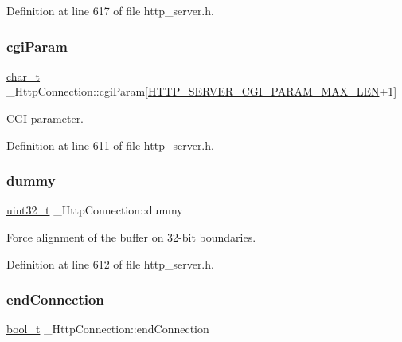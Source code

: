 Definition at line 617 of file http\+\_\+server.\+h.

\mbox{\label{struct__HttpConnection_a7ebae941dca2f49564380d3033849463}} 
\subsubsection{\texorpdfstring{cgi\+Param}{cgiParam}}
{\footnotesize\ttfamily \hyperlink{compiler__port_8h_a40bb5262bf908c328fbcfbe5d29d0201}{char\+\_\+t} \+\_\+\+Http\+Connection\+::cgi\+Param\mbox{[}\hyperlink{http__server_8h_a4a3fc828d1b1db329b49b1f339eb06fe}{H\+T\+T\+P\+\_\+\+S\+E\+R\+V\+E\+R\+\_\+\+C\+G\+I\+\_\+\+P\+A\+R\+A\+M\+\_\+\+M\+A\+X\+\_\+\+L\+EN}+1\mbox{]}}



C\+GI parameter. 



Definition at line 611 of file http\+\_\+server.\+h.

\mbox{\label{struct__HttpConnection_aee9025afb7e8638df5481f8ecc0ec689}} 
\subsubsection{\texorpdfstring{dummy}{dummy}}
{\footnotesize\ttfamily \hyperlink{stdint_8h_a435d1572bf3f880d55459d9805097f62}{uint32\+\_\+t} \+\_\+\+Http\+Connection\+::dummy}



Force alignment of the buffer on 32-\/bit boundaries. 



Definition at line 612 of file http\+\_\+server.\+h.

\mbox{\label{struct__HttpConnection_a2863626c33d19eaa662ba044e34bb888}} 
\subsubsection{\texorpdfstring{end\+Connection}{endConnection}}
{\footnotesize\ttfamily \hyperlink{compiler__port_8h_a812d16e5494522586b3784e55d479912}{bool\+\_\+t} \+\_\+\+Http\+Connection\+::end\+Connection}



